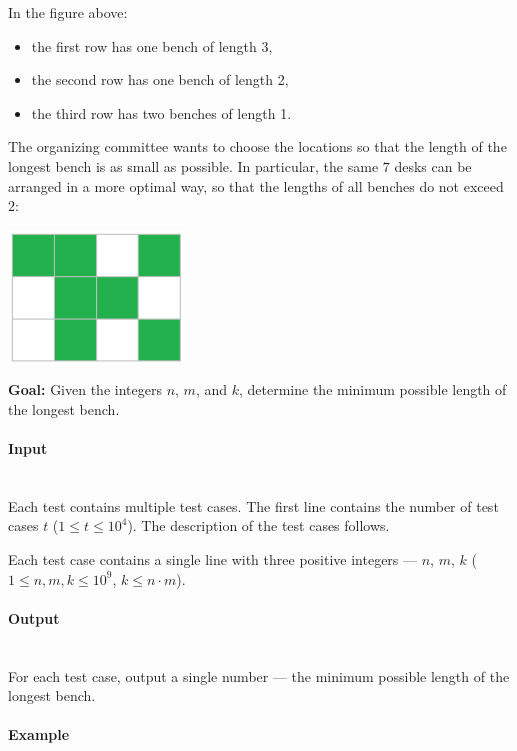 \documentclass{article}
\begin{document}
In the figure above:
\begin{itemize}
    \item the first row has one bench of length 3,
    \item the second row has one bench of length 2,
    \item the third row has two benches of length 1.
\end{itemize}

The organizing committee wants to choose the locations so that the length of the longest bench is as small as possible. In particular, the same $7$ desks can be arranged in a more optimal way, so that the lengths of all benches do not exceed $2$:

\begin{center}
    \includegraphics[width=0.35\textwidth]{Figures/CF_Round1013_D_2.png} 
\end{center}

\textbf{Goal:} Given the integers $n$, $m$, and $k$, determine the minimum possible length of the longest bench.

\paragraph{Input} \mbox{} \\

Each test contains multiple test cases. The first line contains the number of test cases $t$ ($1 \le t \le 10^4$). The description of the test cases follows.

Each test case contains a single line with three positive integers — $n$, $m$, $k$ ($1 \le n, m, k \le 10^9$, $k \le n \cdot m$).


\paragraph{Output}\mbox{} \\

For each test case, output a single number — the minimum possible length of the longest bench.


\paragraph{Example}\mbox{} \\
\end{document}
